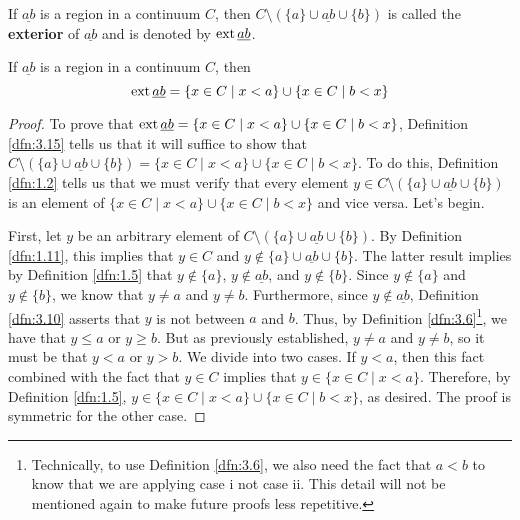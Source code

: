 \documentclass[../main.tex]{subfiles}
\begin{document}
\begin{definition}\label{dfn:3.15}
    If $\underline{ab}$ is a region in a continuum $C$, then $C\setminus(\{a\}\cup\underline{ab}\cup\{b\})$ is called the \textbf{exterior} of $\underline{ab}$ and is denoted by $\operatorname{ext}\underline{ab}$.
\end{definition}

\begin{lemma}\label{lem:3.16}
    If $\underline{ab}$ is a region in a continuum $C$, then
    \begin{equation*}
        \operatorname{ext}\underline{ab} = \{x\in C\mid x<a\}\cup\{x\in C\mid b<x\}
    \end{equation*}
    \begin{proof}
        To prove that $\operatorname{ext}\underline{ab}=\{x\in C\mid x<a\}\cup\{x\in C\mid b<x\}$, Definition \ref{dfn:3.15} tells us that it will suffice to show that $C\setminus(\{a\}\cup\underline{ab}\cup\{b\})=\{x\in C\mid x<a\}\cup\{x\in C\mid b<x\}$. To do this, Definition \ref{dfn:1.2} tells us that we must verify that every element $y\in C\setminus(\{a\}\cup\underline{ab}\cup\{b\})$ is an element of $\{x\in C\mid x<a\}\cup\{x\in C\mid b<x\}$ and vice versa. Let's begin.\par
        First, let $y$ be an arbitrary element of $C\setminus(\{a\}\cup\underline{ab}\cup\{b\})$. By Definition \ref{dfn:1.11}, this implies that $y\in C$ and $y\notin\{a\}\cup\underline{ab}\cup\{b\}$. The latter result implies by Definition \ref{dfn:1.5} that $y\notin\{a\}$, $y\notin\underline{ab}$, and $y\notin\{b\}$. Since $y\notin\{a\}$ and $y\notin\{b\}$, we know that $y\neq a$ and $y\neq b$. Furthermore, since $y\notin\underline{ab}$, Definition \ref{dfn:3.10} asserts that $y$ is not between $a$ and $b$. Thus, by Definition \ref{dfn:3.6}\footnote{Technically, to use Definition \ref{dfn:3.6}, we also need the fact that $a<b$ to know that we are applying case i not case ii. This detail will not be mentioned again to make future proofs less repetitive.}, we have that $y\leq a$ or $y\geq b$. But as previously established, $y\neq a$ and $y\neq b$, so it must be that $y<a$ or $y>b$. We divide into two cases. If $y<a$, then this fact combined with the fact that $y\in C$ implies that $y\in\{x\in C\mid x<a\}$. Therefore, by Definition \ref{dfn:1.5}, $y\in\{x\in C\mid x<a\}\cup\{x\in C\mid b<x\}$, as desired. The proof is symmetric for the other case.\par

\end{proof}
\end{lemma}
\end{document}
